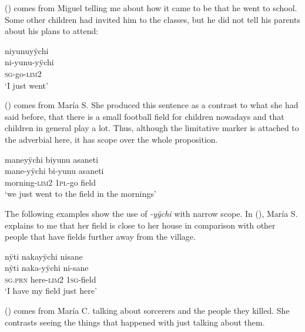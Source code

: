 () comes from Miguel telling me about how it came to be that he went to school. Some other children had invited him to the classes, but he did not tell his parents about his plans to attend:

\ea\label{ex:lim2-4}
\begingl
\glpreamble niyunuyÿchi\\
\gla ni-yunu-yÿchi\\
\textsc{sg}-go-\textsc{lim}2\\
\glft ‘I just went’
\endgl
\trailingcitation{[mxx-p181027l-1.016]}
\xe

() comes from María S. She produced this sentence as a contrast to what she had said before, that there is a small football field for children nowadays and that children in general play a lot. Thus, although the limitative marker is attached to the adverbial here, it has scope over the whole proposition.

\ea\label{ex:lim-2-3}
\begingl
\glpreamble maneyÿchi biyunu asaneti\\
\gla mane-yÿchi bi-yunu asaneti\\
\glb morning-\textsc{lim}2 1\textsc{pl}-go field\\
\glft ‘we just went to the field in the mornings’
\endgl
\trailingcitation{[rxx-p181101l-2.147]}
\xe

The following examples show the use of \textit{-yÿchi} with narrow scope. In (), María S. explains to me that her field is close to her house in comparison with other people that have fields further away from the village.

\ea\label{ex:lim2-2}
\begingl
\glpreamble nÿti nakayÿchi nisane\\
\gla nÿti naka-yÿchi ni-sane\\
\textsc{sg.prn} here-\textsc{lim}2 1\textsc{sg}-field\\
\glft ‘I have my field just here’
\endgl
\trailingcitation{[rxx-e120511l.399]}%
\xe



() comes from María C. talking about sorcerers and the people they killed. She contrasts seeing the things that happened with just talking about them.

